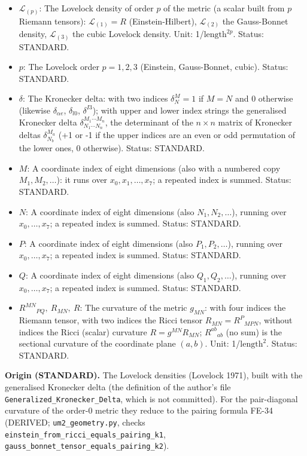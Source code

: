 \documentclass[
  10pt,
]{article}
\providecommand{\tightlist}{%
  \setlength{\itemsep}{0pt}\setlength{\parskip}{0pt}}
\begin{document}
\begin{itemize}
\tightlist
\item
  \(\mathcal{L}_{(p)}\): The Lovelock density of order \(p\) of the
  metric (a scalar built from \(p\) Riemann tensors):
  \(\mathcal{L}_{(1)} = R\) (Einstein-Hilbert), \(\mathcal{L}_{(2)}\)
  the Gauss-Bonnet density, \(\mathcal{L}_{(3)}\) the cubic Lovelock
  density. Unit: 1/\(\mathrm{length}^{2p}\). Status: STANDARD.
\item
  \(p\): The Lovelock order \(p = 1, 2, 3\) (Einstein, Gauss-Bonnet,
  cubic). Status: STANDARD.
\item
  \(\delta\): The Kronecker delta: with two indices \(\delta^M_N = 1\)
  if \(M = N\) and 0 otherwise (likewise \(\delta_{\alpha e}\),
  \(\delta_{l0}\), \(\delta^{I3}\)); with upper and lower index strings
  the generalised Kronecker delta
  \(\delta^{M_1\cdots M_n}_{N_1\cdots N_n}\), the determinant of the
  \(n \times n\) matrix of Kronecker deltas \(\delta^{M_a}_{N_b}\) (+1
  or -1 if the upper indices are an even or odd permutation of the lower
  ones, 0 otherwise). Status: STANDARD.
\item
  \(M\): A coordinate index of eight dimensions (also with a numbered
  copy \(M_1, M_2, \dots\)): it runs over \(x_0, x_1, \dots, x_7\); a
  repeated index is summed. Status: STANDARD.
\item
  \(N\): A coordinate index of eight dimensions (also
  \(N_1, N_2, \dots\)), running over \(x_0, \dots, x_7\); a repeated
  index is summed. Status: STANDARD.
\item
  \(P\): A coordinate index of eight dimensions (also
  \(P_1, P_2, \dots\)), running over \(x_0, \dots, x_7\); a repeated
  index is summed. Status: STANDARD.
\item
  \(Q\): A coordinate index of eight dimensions (also
  \(Q_1, Q_2, \dots\)), running over \(x_0, \dots, x_7\); a repeated
  index is summed. Status: STANDARD.
\item
  \(R^{MN}{}_{PQ},\ R_{MN},\ R\): The curvature of the metric
  \(g_{MN}\): with four indices the Riemann tensor, with two indices the
  Ricci tensor \(R_{MN} = R^P{}_{MPN}\), without indices the Ricci
  (scalar) curvature \(R = g^{MN}R_{MN}\); \(R^{ab}{}_{ab}\) (no sum) is
  the sectional curvature of the coordinate plane \((a, b)\). Unit:
  1/\(\mathrm{length}^{2}\). Status: STANDARD.
\end{itemize}

\textbf{Origin (STANDARD).} The Lovelock densities (Lovelock 1971),
built with the generalised Kronecker delta (the definition of the
author's file \texttt{Generalized\_Kronecker\_Delta}, which is not
committed). For the pair-diagonal curvature of the order-0 metric they
reduce to the pairing formula FE-34 (DERIVED; \texttt{um2\_geometry.py},
checks \texttt{einstein\_from\_ricci\_equals\_pairing\_k1},
\texttt{gauss\_bonnet\_tensor\_equals\_pairing\_k2}).
\end{document}
